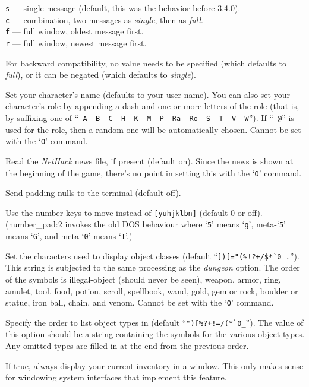 {\tt s} --- single message (default, this was the behavior before 3.4.0).\\
{\tt c} --- combination, two messages as {\it single\/}, then as {\it full\/}.\\
{\tt f} --- full window, oldest message first.\\
{\tt r} --- full window, newest message first.

For backward compatibility, no value needs to be specified (which
defaults to {\it full\/}), or it can be negated (which defaults
to {\it single\/}). 
\item[\ib{name}]
Set your character's name (defaults to your user name).  You can also
set your character's role by appending a dash and one or more letters of
the role (that is, by suffixing one of
``{\tt -A -B -C -H -K -M -P -Ra -Ro -S -T -V -W}'').
If ``{\tt -@}'' is used for the role, then a random one will be
automatically chosen.
Cannot be set with the `{\tt O}' command.
\item[\ib{news}]
Read the {\it NetHack\/} news file, if present (default on).
Since the news is shown at the beginning of the game, there's no point
in setting this with the `{\tt O}' command.
\item[\ib{null}]
Send padding nulls to the terminal (default off).
\item[\ib{number\_pad}]
Use the number keys to move instead of {\tt [yuhjklbn]} (default 0 or off).
(number\_pad:2 invokes the old DOS behaviour where `{\tt 5}' means `{\tt g}', 
meta-`{\tt 5}' means `{\tt G}',  and meta-`{\tt 0}' means `{\tt I}'.)
\item[\ib{objects}]
Set the characters used to display object classes (default
``\verb&])[="(%!?+/$*`0_.&'').
This string is subjected to the same processing as the {\it dungeon\/} option.
The order of the symbols is
illegal-object (should never be seen), weapon, armor, ring, amulet, tool,
food, potion, scroll, spellbook, wand, gold, gem or rock, boulder or statue,
iron ball, chain, and venom.
Cannot be set with the `{\tt O}' command.
\item[\ib{packorder}]
Specify the order to list object types in (default
``\verb&")[%?+!=/(*`0_&''). The value of this option should be a string
containing the symbols for the various object types.  Any omitted types
are filled in at the end from the previous order.
\item[\ib{perm\_invent}]
If true, always display your current inventory in a window.  This only
makes sense for windowing system interfaces that implement this feature.
